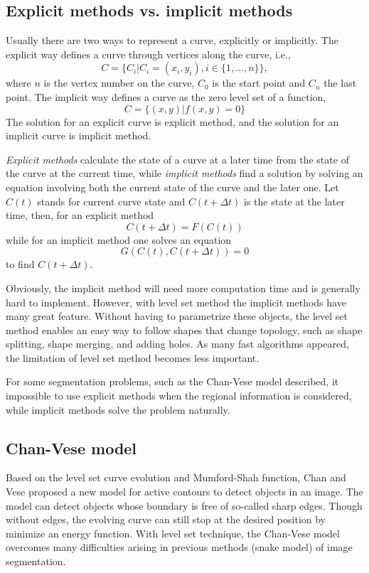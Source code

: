 \subsection{Explicit methods vs. implicit methods}
Usually there are two ways to represent a curve, explicitly or implicitly. The explicit way defines a curve through vertices along the curve, i.e., 
\begin{equation}
C = \{C_i| C_i=(x_i, y_i), i \in \{1,\ldots,n\}\},
\end{equation}
where $n$ is the vertex number on the curve, $C_0$ is the start point and $C_n$ the last point. The implicit way defines a curve as the zero level set of a function,
\begin{equation}
C = \{(x,y)|f(x,y) = 0\}
\end{equation}
The solution for an explicit curve is explicit method, and the solution for an implicit curve is implicit method. 

\emph{Explicit methods} calculate the state of a curve at a later time from the state of the curve at the current time, while \emph{implicit methods} find a solution by solving an equation involving both the current state of the curve and the later one. Let $C(t)$ stands for current curve state and $C(t+\Delta t)$ is the state at the later time, then, for an explicit method
\begin{equation}
C(t+\Delta t) = F(C(t))
\end{equation}
while for an implicit method one solves an equation
\begin{equation}
G(C(t), C(t+\Delta t)) = 0
\end{equation}
to find $C(t + \Delta t)$.

Obviously, the implicit method will need more computation time and is generally hard to implement. However, with level set method the implicit methods have many great feature. Without having to parametrize these objects, the level set method enables an easy way to follow shapes that change topology, such as shape splitting, shape merging, and adding holes. As many fast algorithms appeared, the limitation of level set method becomes less important. 

For some segmentation problems, such as the Chan-Vese model described, it impossible to use explicit methods when the regional information is considered, while implicit methods solve the problem naturally.
\subsection{Chan-Vese model}
Based on the level set curve evolution and Mumford-Shah function, Chan and Vese \cite{chan2001active} proposed a new model for active contours to detect objects in an image. The model can detect objects whose boundary is free of so-called sharp edges. Though without edges, the evolving curve can still stop at the desired position by minimize an energy function. With level set technique, the Chan-Vese model overcomes many difficulties arising in previous methods (snake model) of image segmentation.

